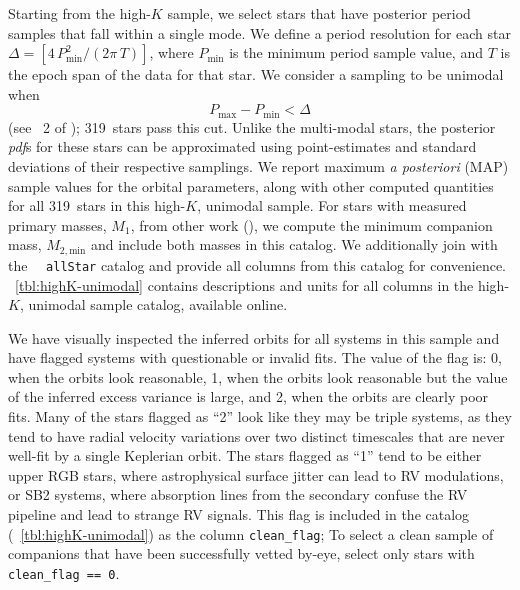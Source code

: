 \documentclass[modern, letterpaper]{aastex62}
\newcommand{\apogee}{\project{\acronym{APOGEE}}}
\newcommand{\DR}{\acronym{DR14}}
\newcommand{\pdf}{\textit{pdf}}
\newcommand{\nunimodal}{319}
\begin{document}
Starting from the high-$K$ sample, we select stars that have posterior period
samples that fall within a single mode.
We define a period resolution for each star $\Delta =
\left[4\,P_{\textrm{min}}^2 / (2\pi \, T) \right]$, where $P_{\textrm{min}}$ is
the minimum period sample value, and $T$ is the epoch span of the data for that
star.
We consider a sampling to be unimodal when
\begin{equation}
    P_{\textrm{max}} - P_{\textrm{min}} < \Delta \label{eq:unimodal}
\end{equation}
(see \sectionname~2 of \citealt{Price-Whelan:2017}); \nunimodal\ stars
pass this cut.
Unlike the multi-modal stars, the posterior \pdf s for these stars can be
approximated using point-estimates and standard deviations of their respective
samplings.
We report maximum \textit{a posteriori} (MAP) sample values for the orbital
parameters, along with other computed quantities for all \nunimodal\ stars in
this high-$K$, unimodal sample.
For stars with measured primary masses, $M_1$, from other work
(\citealt{Ness:2015}), we compute the minimum companion mass, $M_{2,
\textrm{min}}$ and include both masses in this catalog.
We additionally join with the \apogee\ \DR\ \texttt{allStar} catalog and provide
all columns from this catalog for convenience.
\tablename~\ref{tbl:highK-unimodal} contains descriptions and units for all
columns in the high-$K$, unimodal sample catalog, available online.

We have visually inspected the inferred orbits for all systems in this sample
and have flagged systems with questionable or invalid fits.
The value of the flag is: 0, when the orbits look reasonable, 1, when the orbits
look reasonable but the value of the inferred excess variance is large, and 2,
when the orbits are clearly poor fits.
Many of the stars flagged as ``2'' look like they may be triple systems, as they
tend to have radial velocity variations over two distinct timescales that are
never well-fit by a single Keplerian orbit.
The stars flagged as ``1'' tend to be either upper RGB stars, where
astrophysical surface jitter can lead to RV modulations, or SB2 systems, where
absorption lines from the secondary confuse the RV pipeline and lead to strange
RV signals.
This flag is included in the catalog (\tablename~\ref{tbl:highK-unimodal}) as
the column \texttt{clean\_flag}; To select a clean sample of companions that
have been successfully vetted by-eye, select only stars with
\texttt{clean\_flag == 0}.
\end{document}
